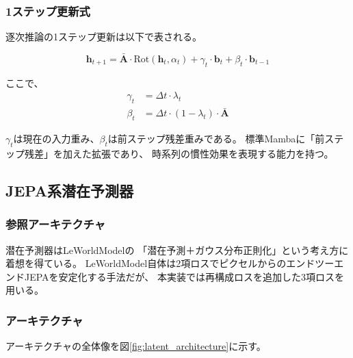 \documentclass[11pt,a4paper]{ltjsarticle}
\begin{document}
\subsubsection{1ステップ更新式}

逐次推論の1ステップ更新は以下で表される。

\begin{equation}
\mathbf{h}_{t+1} = \bar{\mathbf{A}} \cdot \mathrm{Rot}(\mathbf{h}_t, \alpha_t)
  + \gamma_t \cdot \mathbf{b}_t
  + \beta_t \cdot \mathbf{b}_{t-1}
\label{eq:step_update}
\end{equation}

ここで、
\begin{align}
\gamma_t &= \Delta t \cdot \lambda_t \\
\beta_t &= \Delta t \cdot (1 - \lambda_t) \cdot \bar{\mathbf{A}}
\end{align}

$\gamma_t$は現在の入力重み、$\beta_t$は前ステップ残差重みである。
標準Mambaに「前ステップ残差」を加えた拡張であり、
時系列の慣性効果を表現する能力を持つ。

\subsection{JEPA系潜在予測器}

\subsubsection{参照アーキテクチャ}

潜在予測器はLeWorldModel\cite{leworldmodel_2026}の
「潜在予測＋ガウス分布正則化」という考え方に着想を得ている。
LeWorldModel自体は2項ロスでピクセルからのエンドツーエンドJEPAを安定化する手法だが、
本実装では再構成ロスを追加した3項ロスを用いる。

\subsubsection{アーキテクチャ}

アーキテクチャの全体像を図\ref{fig:latent_architecture}に示す。
\end{document}
